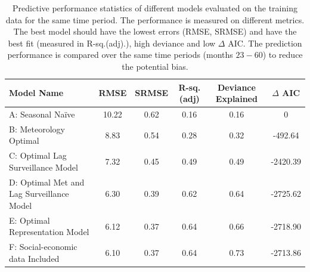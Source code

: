 \documentclass{bmcart}
\begin{document}
\begin{table}[h!]
	\centering
	\begin{tabular}{|lccccc|}
		\hline
		\textbf{Model Name} & \textbf{RMSE} & \textbf{SRMSE} & \textbf{R-sq.(adj)} & \textbf{Deviance Explained} & \textbf{$\Delta$ AIC} \\ 
		\hline
		A: Seasonal Na\"{i}ve  & 10.22 & 0.62 & 0.16 & 0.16 & 0\\ 
		B: Meteorology Optimal & 8.83 & 0.54 & 0.28 & 0.32 & -492.64\\ 
		C: Optimal Lag Surveillance Model  &  7.32 & 0.45 & 0.49 & 0.49 & -2420.39 \\ 
		D: Optimal Met and Lag Surveillance Model  & 6.30 & 0.39 & 0.62 & 0.64 &  -2725.62\\ 
		E: Optimal Representation Model & 6.12 & 0.37 & 0.64 & 0.66 & -2718.90\\ 
		F: Social-economic data Included & 6.10 & 0.37 & 0.64 & 0.73 & -2713.86 \\ 
		\hline
	\end{tabular}
	\caption{Predictive performance statistics of different models evaluated on the training data for the same time period. The performance is measured on different metrics. The best model should have the lowest errors (RMSE, SRMSE) and have the best fit (measured in R-sq.(adj).), high deviance and low $\Delta$ AIC. The prediction performance is compared over the same time periods (months $23-60$) to reduce the potential bias.}
	\label{resultsPrediction}
\end{table}











\end{document}
